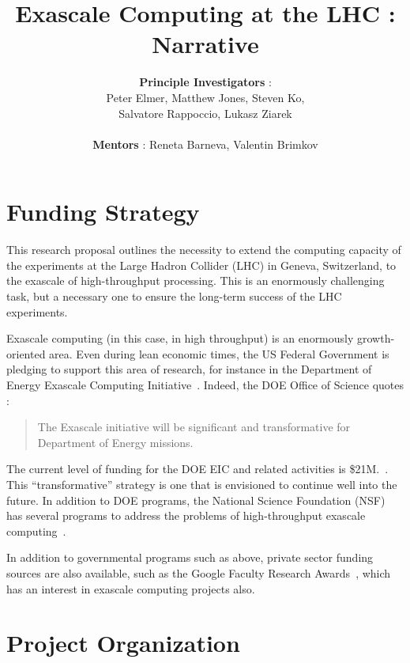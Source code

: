 \documentclass[12pt]{article}
\begin{document}
\title{Exascale Computing at the LHC : Narrative}
\author{{\bf Principle Investigators} : \\ Peter Elmer, Matthew Jones,
  Steven Ko,\\ Salvatore Rappoccio, Lukasz Ziarek \\ \\ {\bf Mentors} : Reneta Barneva, Valentin Brimkov}

\maketitle

\clearpage

\section{Funding Strategy}

This research proposal outlines the necessity to extend the computing
capacity of the experiments at the Large Hadron Collider (LHC) in
Geneva, Switzerland, to the exascale of high-throughput
processing. This is an enormously challenging task, but a necessary
one to ensure the long-term success of the LHC experiments. 

Exascale computing (in this case, in high throughput)
is an enormously growth-oriented area. Even during
lean economic times, the US Federal Government is pledging to support
this area of research, for instance in the Department of Energy
Exascale Computing Initiative~\cite{doe_eci}. Indeed, the DOE Office of
Science quotes :
\begin{quote}
The Exascale initiative will be significant and transformative for Department of Energy missions.
\end{quote}
The current level of funding for the DOE EIC and related activities is
\$21M.~\cite{doe_eci_budget}. This ``transformative'' strategy is one
that is envisioned to continue well into the future. 
In addition to DOE programs, the
National Science Foundation (NSF) has several programs to address the
problems of high-throughput exascale computing~\cite{nsf1,nsf2}.

In addition to governmental programs such as above, private sector
funding sources are also available, such as the Google Faculty
Research Awards~\cite{google_fac_awards}, which has an interest in
exascale computing projects also. 


\clearpage

\section{Project Organization}
\end{document}
